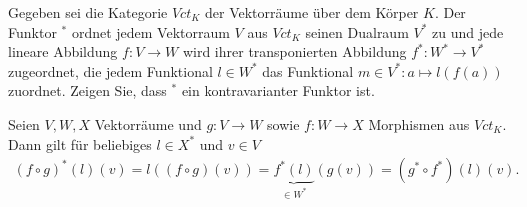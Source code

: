 \begin{exercise}
    Gegeben sei die Kategorie $Vct_K$ der Vektorräume über dem Körper $K$. Der Funktor $^*$ ordnet jedem Vektorraum $V$ aus $Vct_K$ seinen Dualraum $V^*$ zu und jede lineare Abbildung $f:V \to W$ wird ihrer transponierten Abbildung $f^*: W^* \to V^*$ zugeordnet, die jedem Funktional $l \in W^*$ das Funktional $m \in V^* : a \mapsto l(f(a))$ zuordnet. Zeigen Sie, dass $^*$ ein kontravarianter Funktor ist.
\end{exercise}
\begin{solution}
    Seien $V, W, X$ Vektorräume und $g:V \to W$ sowie $f:W \to X$ Morphismen aus $Vct_K$. Dann gilt für beliebiges $l \in X^*$ und $v \in V$
    \begin{align*}
        (f \circ g)^*(l)(v) = l((f \circ g)(v)) = \underbrace{f^*(l)}_{\in W^*}(g(v)) = (g^* \circ f^*)(l)(v).
    \end{align*} 
\end{solution}